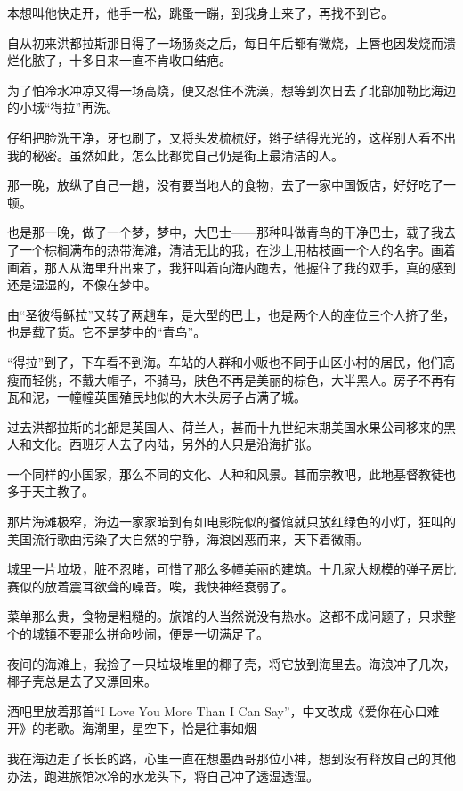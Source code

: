 \par 本想叫他快走开，他手一松，跳蚤一蹦，到我身上来了，再找不到它。
\par 自从初来洪都拉斯那日得了一场肠炎之后，每日午后都有微烧，上唇也因发烧而溃烂化脓了，十多日来一直不肯收口结疤。
\par 为了怕冷水冲凉又得一场高烧，便又忍住不洗澡，想等到次日去了北部加勒比海边的小城“得拉”再洗。
\par 仔细把脸洗干净，牙也刷了，又将头发梳梳好，辫子结得光光的，这样别人看不出我的秘密。虽然如此，怎么比都觉自己仍是街上最清洁的人。
\par 那一晚，放纵了自己一趟，没有要当地人的食物，去了一家中国饭店，好好吃了一顿。
\par 也是那一晚，做了一个梦，梦中，大巴士——那种叫做青鸟的干净巴士，载了我去了一个棕榈满布的热带海滩，清洁无比的我，在沙上用枯枝画一个人的名字。画着画着，那人从海里升出来了，我狂叫着向海内跑去，他握住了我的双手，真的感到还是湿湿的，不像在梦中。
\par 由“圣彼得稣拉”又转了两趟车，是大型的巴士，也是两个人的座位三个人挤了坐，也是载了货。它不是梦中的“青鸟”。
\par “得拉”到了，下车看不到海。车站的人群和小贩也不同于山区小村的居民，他们高瘦而轻佻，不戴大帽子，不骑马，肤色不再是美丽的棕色，大半黑人。房子不再有瓦和泥，一幢幢英国殖民地似的大木头房子占满了城。
\par 过去洪都拉斯的北部是英国人、荷兰人，甚而十九世纪末期美国水果公司移来的黑人和文化。西班牙人去了内陆，另外的人只是沿海扩张。
\par 一个同样的小国家，那么不同的文化、人种和风景。甚而宗教吧，此地基督教徒也多于天主教了。
\par 那片海滩极窄，海边一家家暗到有如电影院似的餐馆就只放红绿色的小灯，狂叫的美国流行歌曲污染了大自然的宁静，海浪凶恶而来，天下着微雨。
\par 城里一片垃圾，脏不忍睹，可惜了那么多幢美丽的建筑。十几家大规模的弹子房比赛似的放着震耳欲聋的噪音。唉，我快神经衰弱了。
\par 菜单那么贵，食物是粗糙的。旅馆的人当然说没有热水。这都不成问题了，只求整个的城镇不要那么拼命吵闹，便是一切满足了。
\par 夜间的海滩上，我捡了一只垃圾堆里的椰子壳，将它放到海里去。海浪冲了几次，椰子壳总是去了又漂回来。
\par 酒吧里放着那首“I Love You More Than I Can Say”，中文改成《爱你在心口难开》的老歌。海潮里，星空下，恰是往事如烟——
\par 我在海边走了长长的路，心里一直在想墨西哥那位小神，想到没有释放自己的其他办法，跑进旅馆冰冷的水龙头下，将自己冲了透湿透湿。
